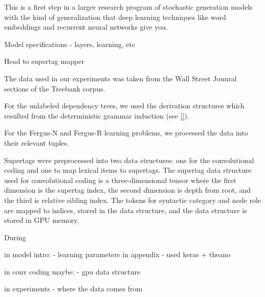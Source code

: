 \documentclass[11pt]{article}
\begin{document}
This is a first step in a larger research program of stochastic generation models with the kind of generalization that deep learning techniques like word embeddings and recurrent neural networks give you. 






\appendix

Model specifications
- layers, learning, etc

Head to supertag mapper


The data used in our experiments was taken from the Wall Street Jounral sections of the Treebank corpus.  

For the unlabeled dependency trees, we used the derivation structures which resulted from the deterministic grammar induction (see \ref{}). 

For the Fergus-N and Fergus-R learning problems, we processed the data into their relevant tuples.

Supertags were preprocessed into two data structures: one for the convolutional coding and one to map lexical items to supertags. 
%
The supertag data structure used for convolutional coding is a three-dimensional tensor where the first dimension is the supertag index, the second dimension is depth from root, and the third is relative sibling index. 
%
The tokens for syntactic category and node role are mapped to indices, stored in the data structure, and the data structure is stored in GPU memory.

During 


in model intro:
    - learning parameters in appendix
    - used keras + theano

in conv coding maybe:
    - gpu data structure

in experiments
    - where the data comes from
\end{document}
